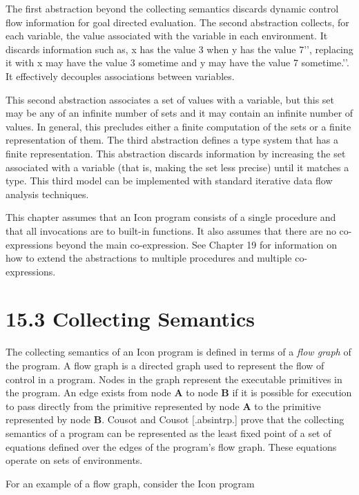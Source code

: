 The first abstraction beyond the collecting semantics discards dynamic
control flow information for goal directed evaluation. The second
abstraction collects, for each variable, the value associated with the
variable in each environment. It discards information such as,
{\textasciigrave}{\textasciigrave}x has the value 3 when y has the
value 7'{}', replacing it with {\textasciigrave}{\textasciigrave}x may
have the value 3 sometime and y may have the value 7 sometime.'{}'. It
effectively decouples associations between variables.

This second abstraction associates a set of values with a variable,
but this set may be any of an infinite number of sets and it may
contain an infinite number of values. In general, this precludes
either a finite computation of the sets or a finite representation of
them. The third abstraction defines a type system that has a finite
representation.  This abstraction discards information by increasing
the set associated with a variable (that is, making the set less
precise) until it matches a type. This third model can be implemented
with standard iterative data flow analysis techniques.

This chapter assumes that an Icon program consists of a single
procedure and that all invocations are to built-in functions. It also
assumes that there are no co-expressions beyond the main
co-expression. See Chapter 19 for information on how to extend the
abstractions to multiple procedures and multiple co-expressions.


\section[15.3 Collecting Semantics]{15.3 Collecting Semantics}

The collecting semantics of an Icon program is defined in terms of a
\textit{flow graph} of the program. A flow graph is a directed graph
used to represent the flow of control in a program. Nodes in the graph
represent the executable primitives in the program. An edge exists
from node \textbf{A} to node \textbf{B} if it is possible for
execution to pass directly from the primitive represented by node
\textbf{A} to the primitive represented by node \textbf{B}. Cousot and
Cousot [.absintrp.] prove that the collecting semantics of a program
can be represented as the least fixed point of a set of equations
defined over the edges of the program's flow graph. These equations
operate on sets of environments.

For an example of a flow graph, consider the Icon program 

